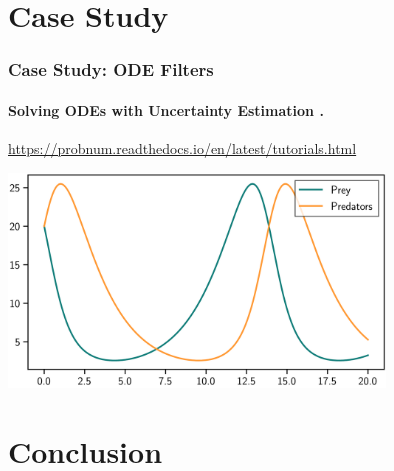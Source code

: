 \documentclass[10pt,usepdftitle=false,aspectratio=169]{beamer}
\begin{document}
\section{Case Study}

\begin{frame}\frametitle{Case Study: ODE Filters}
	\framesubtitle{Solving ODEs with Uncertainty Estimation \cite{Schober2019,Bosch2021}.}

	\begin{center}
		\url{https://probnum.readthedocs.io/en/latest/tutorials.html}
	\end{center}

	\begin{center}
		\includegraphics[width=0.75\textwidth]{figures/predator-prey.png}
	\end{center}

\end{frame}

\section{Conclusion}
\end{document}
